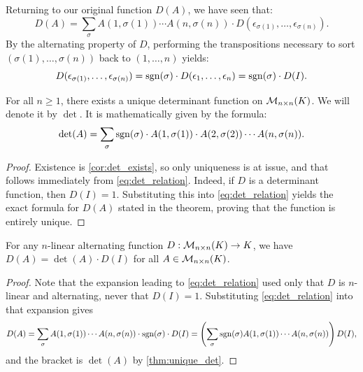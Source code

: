 Returning to our original function $D(A)$, we have seen that:
\[
D(A) = \sum_{\sigma} A(1,\sigma(1)) \cdots A(n,\sigma(n)) \cdot D(\epsilon_{\sigma(1)}, \dots, \epsilon_{\sigma(n)}).
\]
By the alternating property of $D$, performing the transpositions necessary to sort $(\sigma(1), \dots, \sigma(n))$ back to $(1, \dots, n)$ yields:
\begin{equation} \label{eq:det_relation}
  D(\epsilon_{\sigma(1)}, \dots, \epsilon_{\sigma(n)}) = \operatorname{sgn}(\sigma) \cdot D(\epsilon_1, \dots, \epsilon_n) = \operatorname{sgn}(\sigma) \cdot D(I).
\end{equation}

\begin{theorem}
  \label{thm:unique_det}
  For all $n \ge 1$, there exists a unique determinant function on $\mathcal{M}_{n \times n}(K)$. We will denote it by $\det$. It is mathematically given by the formula:
  \[
  \det(A) = \sum_{\sigma} \operatorname{sgn}(\sigma) \cdot A(1,\sigma(1)) \cdot A(2,\sigma(2)) \cdots A(n,\sigma(n)).
  \]
\end{theorem}

\begin{proof}
  Existence is \cref{cor:det_exists}, so only uniqueness is at issue, and that follows immediately from \eqref{eq:det_relation}. Indeed, if $D$ is a determinant function, then $D(I) = 1$. Substituting this into \eqref{eq:det_relation} yields the exact formula for $D(A)$ stated in the theorem, proving that the function is entirely unique.
\end{proof}

\begin{corollary}
  \label{cor:det_pullout}
  For any $n$-linear alternating function $D : \mathcal{M}_{n \times n}(K) \to K$, we have $D(A) = \det(A) \cdot D(I)$ for all $A \in \mathcal{M}_{n \times n}(K)$.
\end{corollary}

\begin{proof}
  Note that the expansion leading to \eqref{eq:det_relation} used only that $D$ is $n$-linear and alternating, never that $D(I) = 1$. Substituting \eqref{eq:det_relation} into that expansion gives
  \[
  D(A) = \sum_{\sigma} A(1,\sigma(1)) \cdots A(n,\sigma(n)) \cdot \operatorname{sgn}(\sigma) \cdot D(I) = \left( \sum_{\sigma} \operatorname{sgn}(\sigma) A(1,\sigma(1)) \cdots A(n,\sigma(n)) \right) D(I),
  \]
  and the bracket is $\det(A)$ by \cref{thm:unique_det}.
\end{proof}

